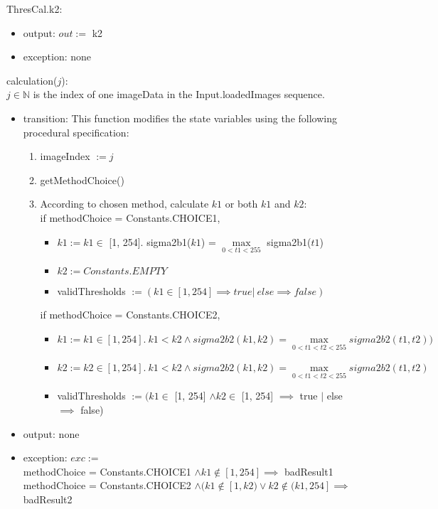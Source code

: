 \documentclass[12pt, titlepage]{article}
\begin{document}
\noindent ThresCal.k2:
\begin{itemize}
\item output: $out :=$ k2
\item exception: none 
\end{itemize}

\noindent calculation($j$):\\
$j \in \mathbb{N}$ is the index of one imageData in the Input.loadedImages
sequence.
\begin{itemize}
\item transition: 
This function modifies
the state variables using the following procedural specification:
\begin{enumerate}
    \item
    imageIndex $:= j$
    \item
    getMethodChoice()
    \item
    According to chosen method, calculate $k1$ or both $k1$ and $k2$:\\
    if methodChoice = Constants.CHOICE1,
\begin{itemize}
\item $k1 := k1 \in$ [1, 254]. sigma2b1($k1$) = $\max\limits_{0< t1<255}$
sigma2b1($t1$)
    \item $k2 := Constants.EMPTY$
\item validThresholds $:= (k1 \in [1, 254] \implies true |\ else \implies
false)$
\end{itemize}
if methodChoice = Constants.CHOICE2,
\begin{itemize}
\item $k1 := k1 \in [1, 254].\ k1 < k2 \land sigma2b2(k1,k2) =
\max\limits_{0<t1<t2<255} sigma2b2(t1,t2))$
\item $k2 := k2 \in [1, 254].\ k1 < k2 \land sigma2b2(k1,k2) =
\max\limits_{0<t1<t2<255} sigma2b2(t1,t2)$
\item validThresholds $:= (k1 \in$ [1, 254] $\land k2 \in$ [1, 254] $\implies$
true $|$ else $\implies$ false)
\end{itemize}
\end{enumerate}
\item output: none
\item exception: $exc :=$\\
methodChoice = Constants.CHOICE1 $\land k1 \not\in [1, 254] \implies$
badResult1\\
methodChoice = Constants.CHOICE2 $\land (k1 \not\in [1,k2) \lor k2 \not\in (k1,
254] \implies$ badResult2
\end{itemize}
\end{document}
